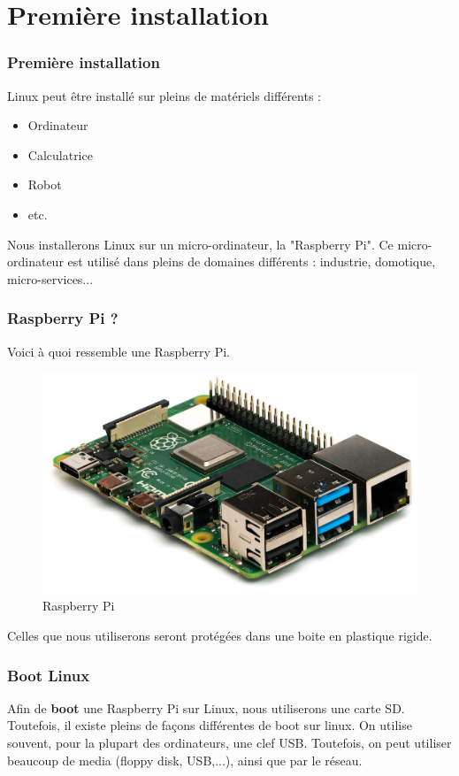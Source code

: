 \documentclass{beamer}
\begin{document}
    \section{Première installation}
        \begin{frame}
            \frametitle{Première installation}
            Linux peut être installé sur pleins de matériels différents :
            \begin{itemize}
                \item Ordinateur
                \item Calculatrice
                \item Robot
                \item etc.
            \end{itemize}
            Nous installerons Linux sur un micro-ordinateur, la "Raspberry Pi".
            Ce micro-ordinateur est utilisé dans pleins de domaines différents : industrie, domotique, micro-services...
        \end{frame}
        \begin{frame}
            \frametitle{Raspberry Pi ?}
            Voici à quoi ressemble une Raspberry Pi.
            \begin{figure}
                \includegraphics[scale=0.07]{./src/raspberrypi.jpg}
                \caption[]{Raspberry Pi}
            \end{figure}
            Celles que nous utiliserons seront protégées dans une boite en plastique rigide.
        \end{frame}
        \begin{frame}
            \frametitle{Boot Linux}
            Afin de \textbf{boot} une Raspberry Pi sur Linux, nous utiliserons une carte SD. Toutefois, il existe pleins de façons différentes de boot sur linux. On utilise souvent, pour la plupart des ordinateurs, une clef USB. Toutefois, on peut utiliser beaucoup de media (floppy disk, USB,...), ainsi que par le réseau.
        \end{frame}
\end{document}
